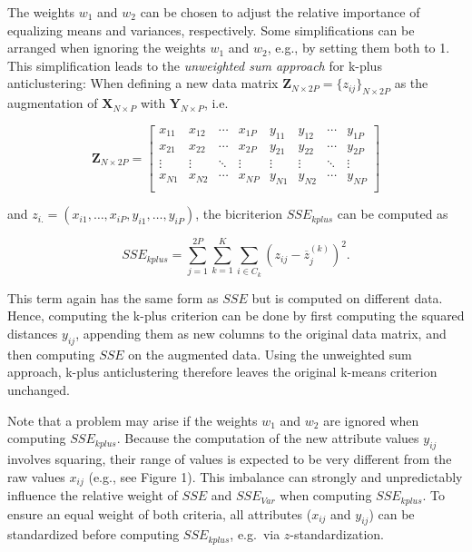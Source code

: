 \documentclass[
  man,floatsintext]{apa7}
\begin{document}
The weights \(w_1\) and \(w_2\) can be chosen to adjust the relative importance of equalizing means and variances, respectively. Some simplifications can be arranged when ignoring the weights \(w_1\) and \(w_2\), e.g., by setting them both to 1. This simplification leads to the \emph{unweighted sum approach} for k-plus anticlustering: When defining a new data matrix \(\mathbf{Z}_{N \times 2P} = \{z_{ij}\}_{N \times 2P}\) as the augmentation of \(\mathbf{X}_{N \times P}\) with \(\mathbf{Y}_{N \times P}\), i.e.

\[
  \mathbf{Z}_{N \times 2P} =
  \left[ {\begin{array}{cccc|cccc}
    x_{11} & x_{12} & \cdots & x_{1P} & y_{11} & y_{12} & \cdots & y_{1P}\\
    x_{21} & x_{22} & \cdots & x_{2P} & y_{21} & y_{22} & \cdots & y_{2P}\\
    \vdots & \vdots & \ddots & \vdots & \vdots & \vdots & \ddots & \vdots\\
    x_{N1} & x_{N2} & \cdots & x_{NP} & y_{N1} & y_{N2} & \cdots & y_{NP}\\
  \end{array} } \right]
\]

and \(z_{i.} = (x_{i1}, \ldots, x_{iP}, y_{i1}, \ldots, y_{iP})\), the bicriterion \(\mathit{SSE_{kplus}}\) can be computed as

\[
\mathit{SSE_{kplus}} =
  \sum\limits_{j=1}^{2 P} 
  \sum\limits_{k=1}^{K} 
  \sum\limits_{i \in C_k}
  (z_{ij} - \overline{z}_j ^{(k)})^2.
\]

This term again has the same form as \(\mathit{SSE}\) but is computed on different data. Hence, computing the k-plus criterion can be done by first computing the squared distances \(y_{ij}\), appending them as new columns to the original data matrix, and then computing \(\mathit{SSE}\) on the augmented data. Using the unweighted sum approach, k-plus anticlustering therefore leaves the original k-means criterion unchanged.

Note that a problem may arise if the weights \(w_1\) and \(w_2\) are ignored when computing \(\mathit{SSE_{kplus}}\). Because the computation of the new attribute values \(y_{ij}\) involves squaring, their range of values is expected to be very different from the raw values \(x_{ij}\) (e.g., see Figure 1). This imbalance can strongly and unpredictably influence the relative weight of \(\mathit{SSE}\) and \(\mathit{SSE_{Var}}\) when computing \(\mathit{SSE_{kplus}}\). To ensure an equal weight of both criteria, all attributes (\(x_{ij}\) and \(y_{ij}\)) can be standardized before computing \(\mathit{SSE_{kplus}}\), e.g.~via \(z\)-standardization.
\end{document}
